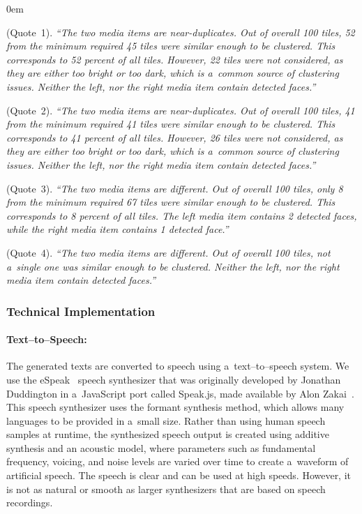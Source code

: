 \begin{description}
  \itemsep0em
  \item[Clustering Consent] (Quote~1). \textit{``The two media items
    are near-duplicates. Out of overall 100 tiles,
    52 from the minimum required 45 tiles
    were similar enough to be clustered. This corresponds to 52 percent
    of all tiles. However, 22 tiles were not considered,
    as they are either too bright or too dark,
    which is a~common source of clustering issues.
    Neither the left, nor the right media item contain detected faces.''}
  \item[Clustering Dissent] (Quote~2). \textit{``The two media items
    are near-duplicates. Out of overall 100 tiles,
    41 from the minimum required 41 tiles were similar enough to be clustered.
    This corresponds to 41 percent of all tiles.
    However, 26 tiles were not considered, as they are either too bright
    or too dark, which is a~common source of clustering issues.
    Neither the left, nor the right media item contain detected faces.''}
  \item[Non-Clustering Dissent] (Quote~3). \textit{``The two media items
    are different. Out of overall 100 tiles,
    only 8 from the minimum required 67 tiles
    were similar enough to be clustered. This corresponds to 8 percent of all tiles.
    The left media item contains 2 detected faces,
    while the right media item contains 1 detected face.''}
  \item[(Non-Clustering Consent)] (Quote~4). \textit{``The two media items
    are different. Out of overall 100 tiles, not a~single one
    was similar enough to be clustered. Neither the left,
    nor the right media item contain detected faces.''}
\end{description}

\subsubsection{Technical Implementation}

\paragraph{Text--to--Speech:}

The generated texts are converted to speech using a~text--to--speech system.
We use the eSpeak~\cite{duddington2012espeak} speech synthesizer
that was originally developed by Jonathan Duddington
in a~JavaScript port called Speak.js,
made available by Alon Zakai~\cite{zakai2012speakjs}.
This speech synthesizer uses the formant synthesis method,
which allows many languages to be provided in a~small size.
Rather than using human speech samples at runtime,
the synthesized speech output is created using additive synthesis
and an acoustic model, where parameters
such as fundamental frequency, voicing, and noise levels
are varied over time to create a~waveform of artificial speech.
The speech is clear and can be used at high speeds.
However, it is not as natural or smooth as larger synthesizers
that are based on speech recordings.


